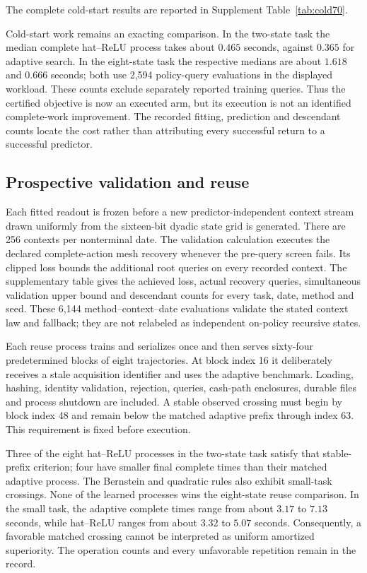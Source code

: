 The complete cold-start results are reported in Supplement Table~\ref{tab:cold70}.


Cold-start work remains an exacting comparison. In the two-state task the median complete hat--ReLU process takes about $0.465$ seconds, against $0.365$ for adaptive search. In the eight-state task the respective medians are about $1.618$ and $0.666$ seconds; both use 2,594 policy-query evaluations in the displayed workload. These counts exclude separately reported training queries. Thus the certified objective is now an executed arm, but its execution is not an identified complete-work improvement. The recorded fitting, prediction and descendant counts locate the cost rather than attributing every successful return to a successful predictor.

\subsection{Prospective validation and reuse}
Each fitted readout is frozen before a new predictor-independent context stream drawn uniformly from the sixteen-bit dyadic state grid is generated. There are 256 contexts per nonterminal date. The validation calculation executes the declared complete-action mesh recovery whenever the pre-query screen fails. Its clipped loss bounds the additional root queries on every recorded context. The supplementary table gives the achieved loss, actual recovery queries, simultaneous validation upper bound and descendant counts for every task, date, method and seed. These 6,144 method--context--date evaluations validate the stated context law and fallback; they are not relabeled as independent on-policy recursive states.

Each reuse process trains and serializes once and then serves sixty-four predetermined blocks of eight trajectories. At block index 16 it deliberately receives a stale acquisition identifier and uses the adaptive benchmark. Loading, hashing, identity validation, rejection, queries, cash-path enclosures, durable files and process shutdown are included. A stable observed crossing must begin by block index 48 and remain below the matched adaptive prefix through index 63. This requirement is fixed before execution.



Three of the eight hat--ReLU processes in the two-state task satisfy that stable-prefix criterion; four have smaller final complete times than their matched adaptive process. The Bernstein and quadratic rules also exhibit small-task crossings. None of the learned processes wins the eight-state reuse comparison. In the small task, the adaptive complete times range from about $3.17$ to $7.13$ seconds, while hat--ReLU ranges from about $3.32$ to $5.07$ seconds. Consequently, a favorable matched crossing cannot be interpreted as uniform amortized superiority. The operation counts and every unfavorable repetition remain in the record.

